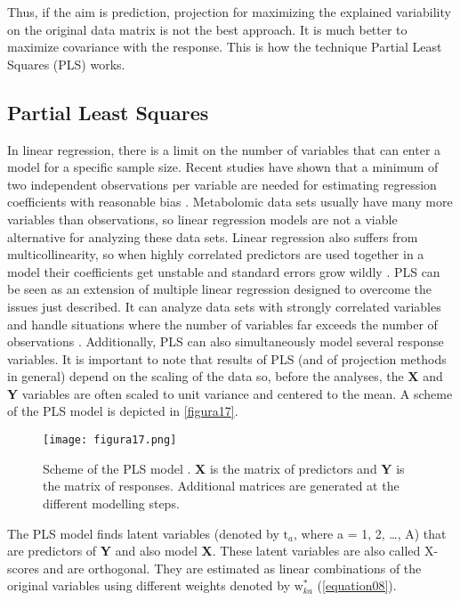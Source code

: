 Thus, if the aim is prediction, projection for maximizing the explained variability on the original data matrix is not the best approach. It is much better to maximize covariance with the response. This is how the technique Partial Least Squares (PLS) works.

\subsection{Partial Least Squares}
In linear regression, there is a limit on the number of variables that can enter a model for a specific sample size. Recent studies have shown that a minimum of two independent observations per variable are needed for estimating regression coefficients with reasonable bias \parencite{austin2015number}. Metabolomic data sets usually have many more variables than observations, so linear regression models are not a viable alternative for analyzing these data sets. Linear regression also suffers from multicollinearity, so when highly correlated predictors are used together in a model their coefficients get unstable and standard errors grow wildly \parencite{alin2010multicollinearity}. PLS can be seen as an extension of multiple linear regression designed to overcome the issues just described. It can analyze data sets with strongly correlated variables and handle situations where the number of variables far exceeds the number of observations \parencite{wold2001pls}. Additionally, PLS can also simultaneously model several response variables. It is important to note that results of PLS (and of projection methods in general) depend on the scaling of the data so, before the analyses, the \textbf{X} and \textbf{Y} variables are often scaled to unit variance and centered to the mean.
A scheme of the PLS model is depicted in \autoref{figura17}.

\begin{figure}[hbtp]
	\centering
\texttt{[image: figura17.png]}
\caption[Scheme of the PLS model]{Scheme of the PLS model \parencite{wold2001pls}. \textbf{X} is the matrix of predictors and \textbf{Y} is the matrix of responses. Additional matrices are generated at the different modelling steps.}
\label{figura17}
\end{figure}

The PLS model finds latent variables (denoted by $\text{t}_a$, where a = 1, 2, \dots, A) that are predictors of \textbf{Y} and also model \textbf{X}. These latent variables are also called X-scores and are orthogonal. They are estimated as linear combinations of the original variables using different weights denoted by $\text{w}^*_{ka}$ (\autoref{equation08}). 

